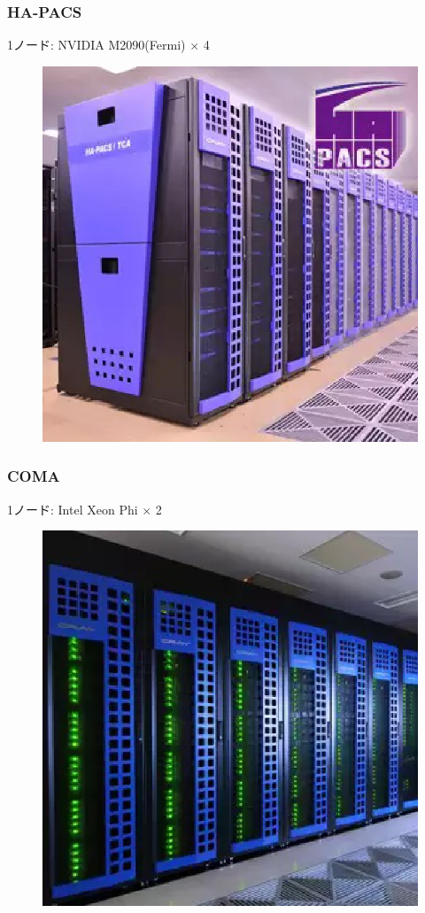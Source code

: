 \documentclass[dvipdfmx,20pt,notheorems,t]{beamer}
\begin{document}
\begin{frame}\frametitle{HA-PACS}
\small
1ノード: NVIDIA M2090(Fermi) $\times$ 4
\begin{figure}[htb]
\centering
\includegraphics[height=0.6\textheight]{hapacs.eps}
\end{figure}
\end{frame}

\begin{frame}\frametitle{COMA}
\small
1ノード: Intel Xeon Phi $\times$ 2
\begin{figure}[htb]
\centering
\includegraphics[height=0.6\textheight]{coma.eps}
\end{figure}
\end{frame}
\end{document}
